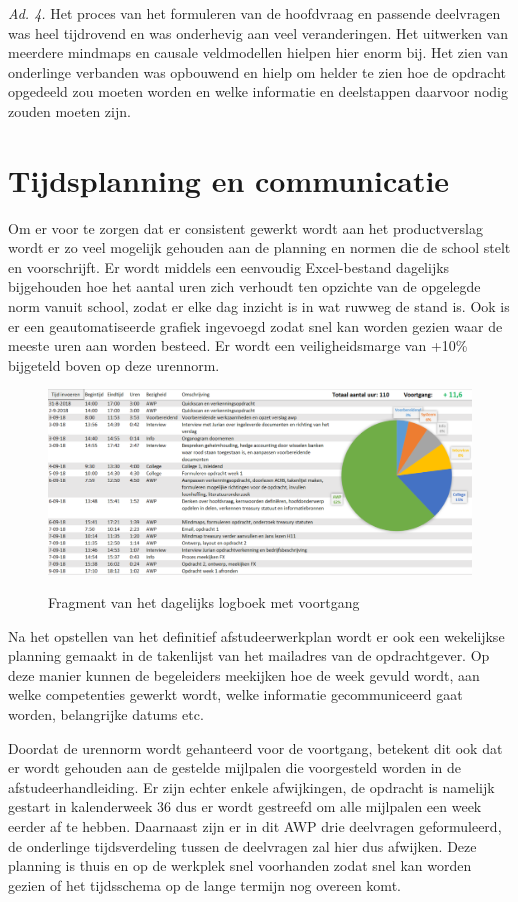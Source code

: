 \documentclass[10pt,a4paper,twoside]{report}
\begin{document}
\bigskip
\noindent
\textit{Ad. 4.} Het proces van het formuleren van de hoofdvraag en passende deelvragen was heel tijdrovend en was onderhevig aan veel veranderingen. Het uitwerken van meerdere mindmaps en causale veldmodellen hielpen hier enorm bij. Het zien van onderlinge verbanden was opbouwend en hielp om helder te zien hoe de opdracht opgedeeld zou moeten worden en welke informatie en deelstappen daarvoor nodig zouden moeten zijn.
\citep{competenties}

\chapter{Tijdsplanning en communicatie}
Om er voor te zorgen dat er consistent gewerkt wordt aan het productverslag wordt er zo veel mogelijk gehouden aan de planning en normen die de school stelt en voorschrijft. Er wordt middels een eenvoudig Excel-bestand dagelijks bijgehouden hoe het aantal uren zich verhoudt ten opzichte van de opgelegde norm vanuit school, zodat er elke dag inzicht is in wat ruwweg de stand is. Ook is er een geautomatiseerde grafiek ingevoegd zodat snel kan worden gezien waar de meeste uren aan worden besteed. Er wordt een veiligheidsmarge van +10\% bijgeteld boven op deze urennorm. 

\begin{figure}[h]
    \centering
    \includegraphics[width=\textwidth]{logboek}
    \label{fig:logboek}
    \caption{Fragment van het dagelijks logboek met voortgang}
\end{figure}

Na het opstellen van het definitief afstudeerwerkplan wordt er ook een wekelijkse planning gemaakt in de takenlijst van het mailadres van de opdrachtgever. Op deze manier kunnen de begeleiders meekijken hoe de week gevuld wordt, aan welke competenties gewerkt wordt, welke informatie gecommuniceerd gaat worden, belangrijke datums etc.

\newpage
Doordat de urennorm wordt gehanteerd voor de voortgang, betekent dit ook dat er wordt gehouden aan de gestelde mijlpalen die voorgesteld worden in de afstudeerhandleiding. Er zijn echter enkele afwijkingen, de opdracht is namelijk gestart in kalenderweek 36 dus er wordt gestreefd om alle mijlpalen een week eerder af te hebben. Daarnaast zijn er in dit AWP drie deelvragen geformuleerd, de onderlinge tijdsverdeling tussen de deelvragen zal hier dus afwijken. Deze planning is thuis en op de werkplek snel voorhanden zodat snel kan worden gezien of het tijdsschema op de lange termijn nog overeen komt.
\end{document}

